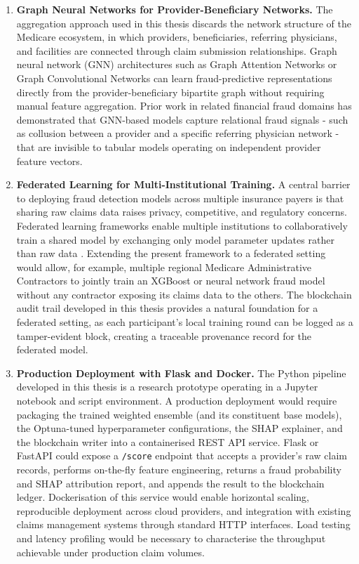 \begin{enumerate}[leftmargin=*,label=\textbf{\arabic*.}]
\item \textbf{Graph Neural Networks for Provider-Beneficiary Networks.}
The aggregation approach used in this thesis discards the network structure of the Medicare ecosystem, in which providers, beneficiaries, referring physicians, and facilities are connected through claim submission relationships. Graph neural network (GNN) architectures such as Graph Attention Networks \cite{wang2021deep} or Graph Convolutional Networks can learn fraud-predictive representations directly from the provider-beneficiary bipartite graph without requiring manual feature aggregation. Prior work in related financial fraud domains \cite{liang2019} has demonstrated that GNN-based models capture relational fraud signals - such as collusion between a provider and a specific referring physician network - that are invisible to tabular models operating on independent provider feature vectors.

\item \textbf{Federated Learning for Multi-Institutional Training.}
A central barrier to deploying fraud detection models across multiple insurance payers is that sharing raw claims data raises privacy, competitive, and regulatory concerns. Federated learning frameworks enable multiple institutions to collaboratively train a shared model by exchanging only model parameter updates rather than raw data \cite{li2021}. Extending the present framework to a federated setting would allow, for example, multiple regional Medicare Administrative Contractors to jointly train an XGBoost or neural network fraud model without any contractor exposing its claims data to the others. The blockchain audit trail developed in this thesis provides a natural foundation for a federated setting, as each participant's local training round can be logged as a tamper-evident block, creating a traceable provenance record for the federated model.

\item \textbf{Production Deployment with Flask and Docker.}
The Python pipeline developed in this thesis is a research prototype operating in a Jupyter notebook and script environment. A production deployment would require packaging the trained weighted ensemble (and its constituent base models), the Optuna-tuned hyperparameter configurations, the SHAP explainer, and the blockchain writer into a containerised REST API service. Flask or FastAPI could expose a \texttt{/score} endpoint that accepts a provider's raw claim records, performs on-the-fly feature engineering, returns a fraud probability and SHAP attribution report, and appends the result to the blockchain ledger. Dockerisation of this service would enable horizontal scaling, reproducible deployment across cloud providers, and integration with existing claims management systems through standard HTTP interfaces. Load testing and latency profiling would be necessary to characterise the throughput achievable under production claim volumes.

\end{enumerate}


